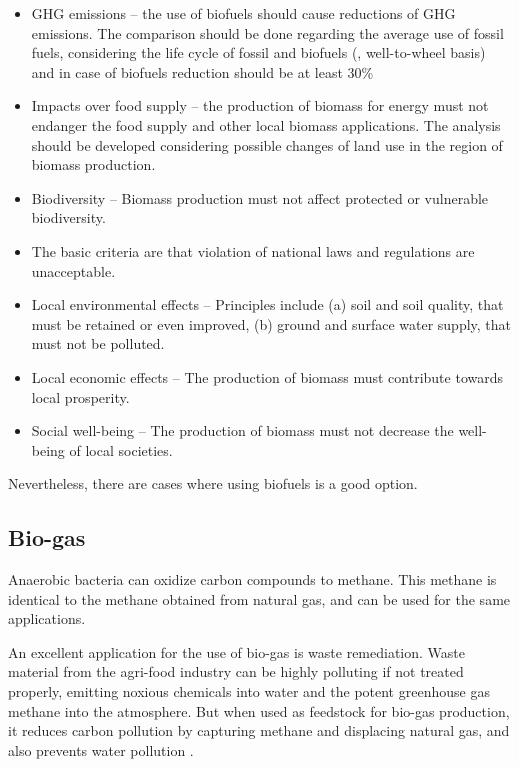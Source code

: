 \begin{itemize}
  \item GHG emissions – the use of biofuels should cause reductions of GHG emissions. The
comparison should be done regarding the average use of fossil fuels, considering the life
cycle of fossil and biofuels (, well-to-wheel basis) and in case of biofuels reduction
should be at least 30\%
 \item Impacts over food supply – the production of biomass for energy must not endanger the
food supply and other local biomass applications. The analysis should be developed
considering possible changes of land use in the region of biomass production.
 \item Biodiversity – Biomass production must not affect protected or vulnerable biodiversity.
 \item The basic criteria are that violation of national laws and regulations are unacceptable.
 \item Local environmental effects – Principles include (a) soil and soil quality, that must be
retained or even improved, (b) ground and surface water supply, that must not be polluted.
 \item Local economic effects – The production of biomass must contribute towards local
prosperity.
 \item  Social well-being – The production of biomass must not decrease the well-being of local societies. 
\end{itemize}

Nevertheless, there are cases where using biofuels is a good option. 

\subsection{Bio-gas}

Anaerobic bacteria can oxidize carbon compounds to methane. This methane is
identical to the methane obtained from natural gas, and can be used for the same
applications.

An excellent application for the use of bio-gas is waste remediation. Waste
material from the agri-food industry can be highly polluting if not treated
properly, emitting noxious chemicals into water and the potent greenhouse gas
methane into the atmosphere. But when used as feedstock for bio-gas production,
it reduces carbon pollution by capturing methane and displacing natural gas, and
also prevents water pollution \autocite{Venter2014}. 

